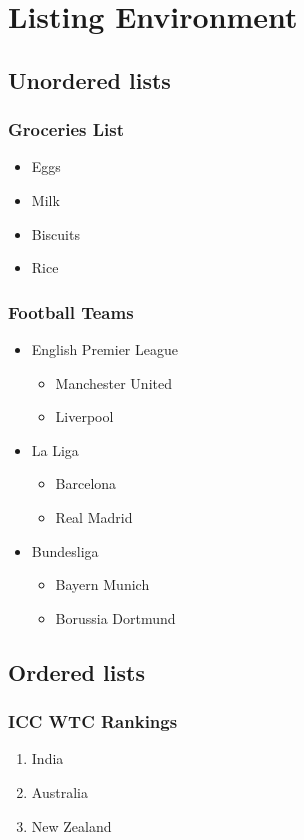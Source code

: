 \documentclass[6pt,a4paper]{report}
\begin{document}
\chapter{Listing Environment}
\begin{small}
\section*{Unordered lists}
\subsection*{Groceries List}
\begin{itemize}
\item Eggs
\item Milk
\item Biscuits
\item Rice
\end{itemize}
\subsection*{Football Teams}
\begin{itemize}
\item English Premier League
\begin{itemize}
\item Manchester United
\item Liverpool
\end{itemize}
\item La Liga
\begin{itemize}
\item Barcelona
\item Real Madrid
\end{itemize}
\item Bundesliga
\begin{itemize}
\item Bayern Munich
\item Borussia Dortmund
\end{itemize}
\end{itemize}
\section*{Ordered lists}
\subsection*{ICC WTC Rankings}
\begin{enumerate}
\item India
\item Australia
\item New Zealand
\end{enumerate}

\end{small}
\end{document}
